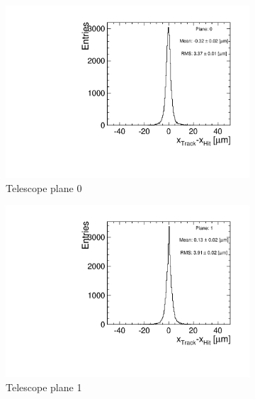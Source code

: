\begin{figure}[htbp] \centering
  \begin{subfigure}[b]{0.3\textwidth}
    \includegraphics[width=\textwidth]{figures/Telescope/biasedResiduals/BiasedResiduals_run77_PlaneXRMS0.pdf}
    \caption{Telescope plane 0}
  \end{subfigure}\hfill
  \begin{subfigure}[b]{0.3\textwidth}
    \includegraphics[width=\textwidth]{figures/Telescope/biasedResiduals/BiasedResiduals_run77_PlaneXRMS1.pdf}
    \caption{Telescope plane 1}
  \end{subfigure}\hfill
  \begin{subfigure}[b]{0.3\textwidth}

\end{subfigure}
\end{figure}
